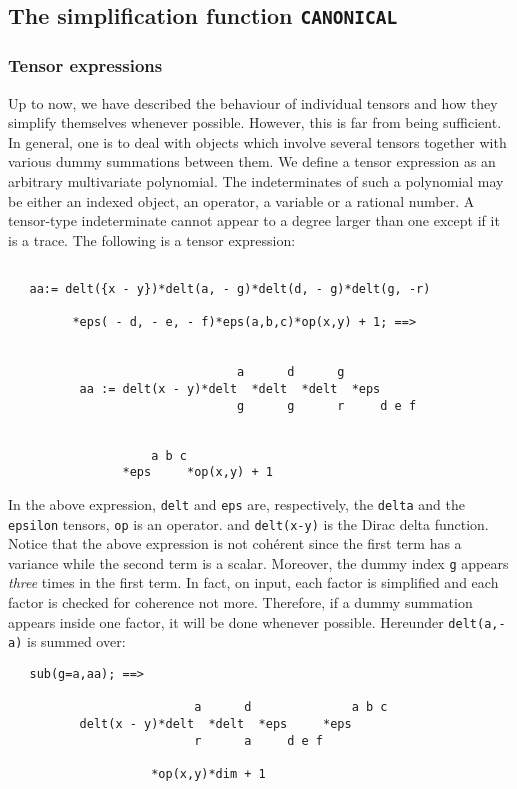 \subsection{The simplification function \texttt{CANONICAL}}

\subsubsection{Tensor expressions}
Up to now, we have described the behaviour of individual
tensors and how they simplify themselves whenever possible.
However, this is far from being sufficient. In general, one is
to deal with objects which involve several tensors together 
with various dummy summations between them.
We define a tensor expression as an arbitrary multivariate 
polynomial. The indeterminates of such a polynomial may be 
either an indexed object, an operator, a variable or a rational number.
A tensor-type indeterminate cannot appear to a degree larger 
than one except if it is a trace.
The following is a tensor expression:
\begin{verbatim}

   aa:= delt({x - y})*delt(a, - g)*delt(d, - g)*delt(g, -r)
         
         *eps( - d, - e, - f)*eps(a,b,c)*op(x,y) + 1; ==>


                                a      d      g
          aa := delt(x - y)*delt  *delt  *delt  *eps
                                g      g      r     d e f


                    a b c
                *eps     *op(x,y) + 1

\end{verbatim}
In the above expression, \texttt{delt} and \texttt{eps} are, respectively, the
\texttt{delta} and the \texttt{epsilon} tensors,
\texttt{op} is an operator. 
and \texttt{delt(x-y)} is the Dirac delta function.
Notice that the above expression is not coh\'erent since the first term 
has a variance while the second term is a scalar. Moreover, the 
dummy index \texttt{g} appears \emph{three} times in the first term.
In fact, on input, each factor  is simplified   and each 
factor is checked for coherence not more.
Therefore, if a dummy summation  appears inside one factor, it will 
be done whenever possible. Hereunder \texttt{delt(a,-a)} is 
summed over:
\begin{verbatim}
   sub(g=a,aa); ==>

                          a      d              a b c
          delt(x - y)*delt  *delt  *eps     *eps     
                          r      a     d e f

                    *op(x,y)*dim + 1
\end{verbatim}

